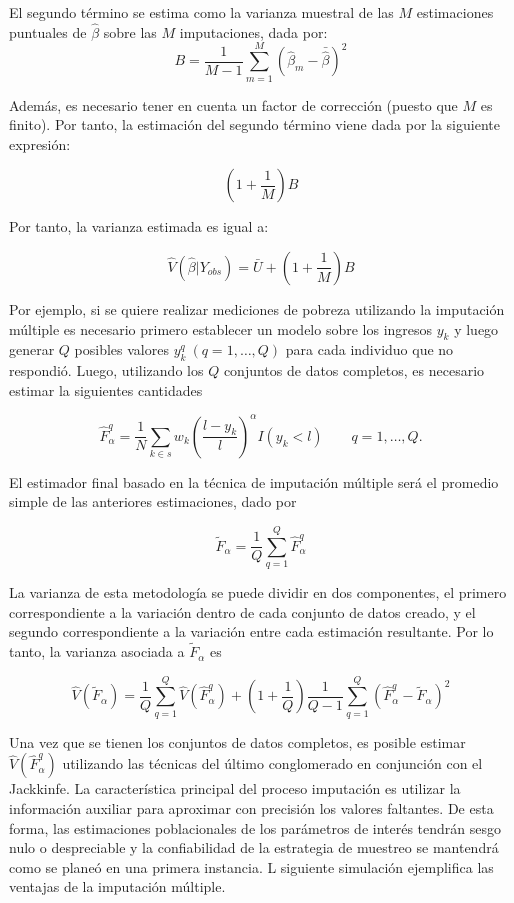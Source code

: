 \documentclass[
  12pt,
  spanish,
]{book}
\begin{document}
El segundo término se estima como la varianza muestral de las \(M\) estimaciones puntuales de \(\hat{\beta}\) sobre las \(M\) imputaciones, dada por:
\[
B = \frac{1}{M-1} \sum_{m = 1} ^ M (\hat{\beta}_m - \bar{\hat{\beta}})^2
\]

Además, es necesario tener en cuenta un factor de corrección (puesto que \(M\) es finito). Por tanto, la estimación del segundo término viene dada por la siguiente expresión:

\[
\left(1 + \frac{1}{M}\right) B
\]

Por tanto, la varianza estimada es igual a:

\[
\hat{V}(\hat{\beta} | Y_{obs}) = \bar{U} + \left(1 + \frac{1}{M}\right) B
\]

Por ejemplo, si se quiere realizar mediciones de pobreza utilizando la imputación múltiple es necesario primero establecer un modelo sobre los ingresos \(y_k\) y luego generar \(Q\) posibles valores \(y_k^q \ (q=1, \ldots, Q)\) para cada individuo que no respondió. Luego, utilizando los \(Q\) conjuntos de datos completos, es necesario estimar la siguientes cantidades

\[
\hat{F}_{\alpha}^{q}=\frac{1}{N}\sum_{k\in s} w_k 
\left(\frac{l-y_k}{l}\right)^{\alpha}I(y_k<l) \ \ \ \ \ \ \ \ \ 
q= 1,\ldots, Q.
\]

El estimador final basado en la técnica de imputación múltiple será el promedio simple de las anteriores estimaciones, dado por

\[
\tilde{F}_{\alpha}=\frac{1}{Q}\sum_{q=1}^Q \hat{F}_{\alpha}^{q}
\]

La varianza de esta metodología se puede dividir en dos componentes, el primero correspondiente a la variación dentro de cada conjunto de datos creado, y el segundo correspondiente a la variación entre cada estimación resultante. Por lo tanto, la varianza asociada a \(\tilde{F}_{\alpha}\) es

\[
\hat{V}(\tilde{F}_{\alpha})
= \frac{1}{Q}\sum_{q=1}^Q \hat{V}(\hat{F}_{\alpha}^{q})
+ \left(1+\frac{1}{Q}\right)\frac{1}{Q-1}\sum_{q=1}^Q (\hat{F}_{\alpha}^{q}-\tilde{F}_{\alpha})^2
\]

Una vez que se tienen los conjuntos de datos completos, es posible estimar \(\hat{V}(\hat{F}_{\alpha}^{q})\) utilizando las técnicas del último conglomerado en conjunción con el Jackkinfe. La característica principal del proceso imputación es utilizar la información auxiliar para aproximar con precisión los valores faltantes. De esta forma, las estimaciones poblacionales de los parámetros de interés tendrán sesgo nulo o despreciable y la confiabilidad de la estrategia de muestreo se mantendrá como se planeó en una primera instancia. L siguiente simulación ejemplifica las ventajas de la imputación múltiple.
\end{document}

